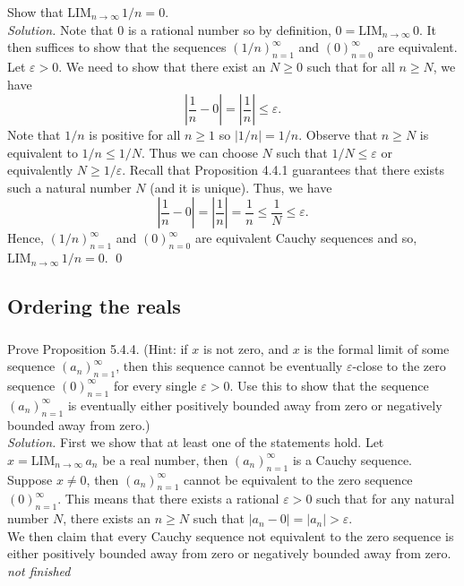 \documentclass{amsart}
\theoremstyle{definition}
\newcommand{\soln}{\newline\textit{Solution.} }
\newcommand{\LIM}{\mathrm{LIM}_{n\to\infty}\,}
\begin{document}
\subsubsection{} Show that $\LIM 1/n=0$. \\
\soln Note that $0$ is a rational number so by definition, $0=\LIM 0$. It then suffices to show that the sequences $(1/n)_{n=1}^\infty$ and $(0)_{n=0}^\infty$ are equivalent. Let $\varepsilon>0$. We need to show that there exist an $N\geq0$ such that for all $n\geq N$, we have
\[
\left|\frac{1}{n}-0\right|=\left|\frac{1}{n}\right|\leq\varepsilon.
\]
Note that $1/n$ is positive for all $n\geq 1$ so $|1/n|=1/n$. Observe that $n\geq N$ is equivalent to $1/n\leq 1/N$. Thus we can choose $N$ such that $1/N\leq \varepsilon$ or equivalently $N\geq 1/\varepsilon$. Recall that Proposition 4.4.1 guarantees that there exists such a natural number $N$ (and it is unique). Thus, we have
\[
\left|\frac{1}{n}-0\right|=\left|\frac{1}{n}\right|=\frac{1}{n}\leq\frac{1}{N}\leq\varepsilon.
\]
Hence, $(1/n)_{n=1}^\infty$ and $(0)_{n=0}^\infty$ are equivalent Cauchy sequences and so, $\LIM 1/n=0$. \qed \\


\subsection{Ordering the reals}

\subsubsection{} Prove Proposition 5.4.4. (Hint: if $x$ is not zero, and $x$ is the formal limit of some sequence $(a_n)_{n=1}^\infty$, then this sequence cannot be eventually $\varepsilon$-close to the zero sequence $(0)_{n=1}^\infty$ for every single $\varepsilon>0$. Use this to show that the sequence $(a_n)_{n=1}^\infty$ is eventually either positively bounded away from zero or negatively bounded away from zero.) \\
\soln First we show that at least one of the statements hold. Let $x=\LIM a_n$ be a real number, then $(a_n)_{n=1}^\infty$ is a Cauchy sequence. Suppose $x\neq0$, then $(a_n)_{n=1}^\infty$ cannot be equivalent to the zero sequence $(0)_{n=1}^\infty$. This means that there exists a rational $\varepsilon>0$ such that for any natural number $N$, there exists an $n\geq N$ such that $|a_n-0|=|a_n|>\varepsilon$. \\
We then claim that every Cauchy sequence not equivalent to the zero sequence is either positively bounded away from zero or negatively bounded away from zero. \textit{not finished}
\end{document}
